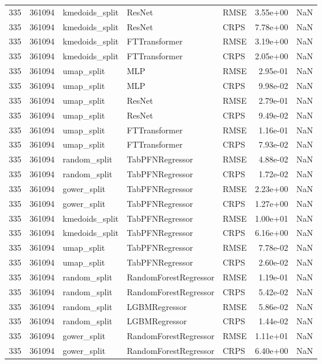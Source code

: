 \begin{tabular}{rrlllrr}
335 & 361094 & kmedoids\_split & ResNet & RMSE & 3.55e+00 & NaN \\
335 & 361094 & kmedoids\_split & ResNet & CRPS & 7.78e+00 & NaN \\
335 & 361094 & kmedoids\_split & FTTransformer & RMSE & 3.19e+00 & NaN \\
335 & 361094 & kmedoids\_split & FTTransformer & CRPS & 2.05e+00 & NaN \\
335 & 361094 & umap\_split & MLP & RMSE & 2.95e-01 & NaN \\
335 & 361094 & umap\_split & MLP & CRPS & 9.98e-02 & NaN \\
335 & 361094 & umap\_split & ResNet & RMSE & 2.79e-01 & NaN \\
335 & 361094 & umap\_split & ResNet & CRPS & 9.49e-02 & NaN \\
335 & 361094 & umap\_split & FTTransformer & RMSE & 1.16e-01 & NaN \\
335 & 361094 & umap\_split & FTTransformer & CRPS & 7.93e-02 & NaN \\
335 & 361094 & random\_split & TabPFNRegressor & RMSE & 4.88e-02 & NaN \\
335 & 361094 & random\_split & TabPFNRegressor & CRPS & 1.72e-02 & NaN \\
335 & 361094 & gower\_split & TabPFNRegressor & RMSE & 2.23e+00 & NaN \\
335 & 361094 & gower\_split & TabPFNRegressor & CRPS & 1.27e+00 & NaN \\
335 & 361094 & kmedoids\_split & TabPFNRegressor & RMSE & 1.00e+01 & NaN \\
335 & 361094 & kmedoids\_split & TabPFNRegressor & CRPS & 6.16e+00 & NaN \\
335 & 361094 & umap\_split & TabPFNRegressor & RMSE & 7.78e-02 & NaN \\
335 & 361094 & umap\_split & TabPFNRegressor & CRPS & 2.60e-02 & NaN \\
335 & 361094 & random\_split & RandomForestRegressor & RMSE & 1.19e-01 & NaN \\
335 & 361094 & random\_split & RandomForestRegressor & CRPS & 5.42e-02 & NaN \\
335 & 361094 & random\_split & LGBMRegressor & RMSE & 5.86e-02 & NaN \\
335 & 361094 & random\_split & LGBMRegressor & CRPS & 1.44e-02 & NaN \\
335 & 361094 & gower\_split & RandomForestRegressor & RMSE & 1.11e+01 & NaN \\
335 & 361094 & gower\_split & RandomForestRegressor & CRPS & 6.40e+00 & NaN \\

\end{tabular}
